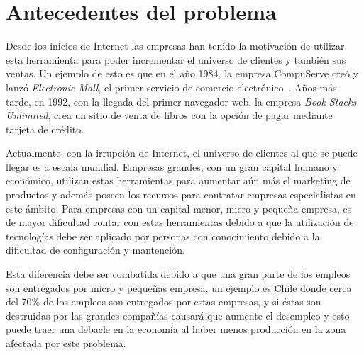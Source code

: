 \section{Antecedentes del problema}

Desde los inicios de Internet las empresas han tenido la motivación de utilizar
esta herramienta para poder incrementar el universo de clientes y también sus
ventas.
Un ejemplo de esto es que en el año 1984, la empresa CompuServe creó y lanzó
\emph{Electronic Mall}, el primer servicio de comercio electrónico~\cite{Def:1}.
Años más tarde, en 1992, con la llegada del primer navegador web, la empresa
\emph{Book Stacks Unlimited}, crea un sitio de venta de libros con la opción de
pagar mediante tarjeta de crédito.

Actualmente, con la irrupción de Internet, el universo de clientes al que se
puede llegar es a escala mundial.
Empresas grandes, con un gran capital humano y económico, utilizan estas
herramientas para aumentar aún más el marketing de productos y además poseen los
recursos para contratar empresas especialistas en este ámbito.
Para empresas con un capital menor, micro y pequeña empresa, es de mayor
dificultad contar con estas herramientas debido a que la utilización de 
tecnologías debe ser aplicado por personas con conocimiento debido a la dificultad
de configuración y mantención.

Esta diferencia debe ser combatida debido a que una gran parte de los empleos
son entregados por micro y pequeñas empresa, un ejemplo es Chile donde cerca del
70\% de los empleos son entregados por estas empresas, y si éstas son destruidas
por las grandes compañías causará que aumente el desempleo y esto puede traer una
debacle en la economía al haber menos producción en la zona afectada por este
problema.


